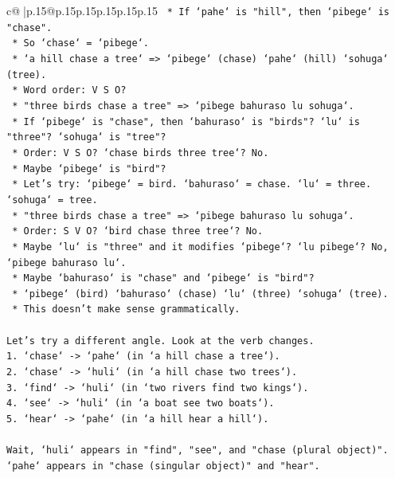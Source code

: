 \documentclass{article}
\begin{document}
{\begin{supertabular}{c@{$\;$}|p{.15\linewidth}@{}p{.15\linewidth}p{.15\linewidth}p{.15\linewidth}p{.15\linewidth}p{.15\linewidth}}
{{{\texttt{        *   If `pahe` is "hill", then `pibege` is "chase".} \\
\texttt{        *   So `chase` = `pibege`.} \\
\texttt{        *   `a hill chase a tree` => `pibege` (chase) `pahe` (hill) `sohuga` (tree).} \\
\texttt{        *   Word order: V S O?} \\
\texttt{        *   "three birds chase a tree" => `pibege bahuraso lu sohuga`.} \\
\texttt{        *   If `pibege` is "chase", then `bahuraso` is "birds"? `lu` is "three"? `sohuga` is "tree"?} \\
\texttt{        *   Order: V S O? `chase birds three tree`? No.} \\
\texttt{        *   Maybe `pibege` is "bird"?} \\
\texttt{        *   Let's try: `pibege` = bird. `bahuraso` = chase. `lu` = three. `sohuga` = tree.} \\
\texttt{        *   "three birds chase a tree" => `pibege bahuraso lu sohuga`.} \\
\texttt{        *   Order: S V O? `bird chase three tree`? No.} \\
\texttt{        *   Maybe `lu` is "three" and it modifies `pibege`? `lu pibege`? No, `pibege bahuraso lu`.} \\
\texttt{        *   Maybe `bahuraso` is "chase" and `pibege` is "bird"?} \\
\texttt{        *   `pibege` (bird) `bahuraso` (chase) `lu` (three) `sohuga` (tree).} \\
\texttt{        *   This doesn't make sense grammatically.} \\
\\ 
\texttt{Let's try a different angle. Look at the verb changes.} \\
\texttt{1. `chase` {-}> `pahe` (in `a hill chase a tree`).} \\
\texttt{2. `chase` {-}> `huli` (in `a hill chase two trees`).} \\
\texttt{3. `find` {-}> `huli` (in `two rivers find two kings`).} \\
\texttt{4. `see` {-}> `huli` (in `a boat see two boats`).} \\
\texttt{5. `hear` {-}> `pahe` (in `a hill hear a hill`).} \\
\\ 
\texttt{Wait, `huli` appears in "find", "see", and "chase (plural object)".} \\
\texttt{`pahe` appears in "chase (singular object)" and "hear".} \\
}}}
\end{supertabular}}
\end{document}
